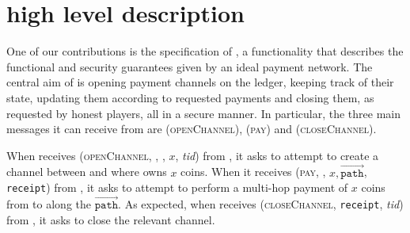 \section{\fpaynet{} high level description}
  One of our contributions is the specification of \fpaynet, a functionality
  that describes the functional and security guarantees given by an ideal
  payment network. The central aim of \fpaynet{} is opening payment channels on
  the ledger, keeping track of their state, updating them according to requested
  payments and closing them, as requested by honest players, all in a secure
  manner. In particular, the three main messages it can receive from \alice{}
  are (\textsc{openChannel}), (\textsc{pay}) and (\textsc{closeChannel}).

  When \fpaynet{} receives (\textsc{openChannel}, \alice, \bob, $x$,
  \textit{tid}) from \alice, it asks \simulator{} to attempt to create a channel
  between \alice{} and \bob{} where \alice{} owns $x$ coins. When it receives
  (\textsc{pay}, \bob, $x, \overrightarrow{\mathtt{path}}$, \texttt{receipt})
  from \alice, it asks \simulator{} to attempt to perform a multi-hop payment of
  $x$ coins from \alice{} to \bob{} along the $\overrightarrow{\mathtt{path}}$.
  As expected, when \fpaynet{} receives (\textsc{closeChannel}, \texttt{receipt},
  \textit{tid}) from \alice, it asks \simulator{} to close the relevant channel.

